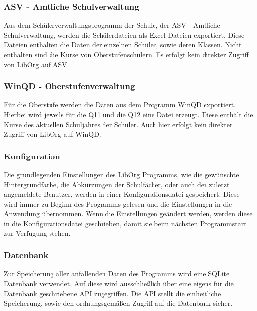 \subsubsection{ASV - Amtliche Schulverwaltung}
\label{DEF:ASV}
Aus dem Schülerverwaltungsprogramm der Schule, der ASV - Amtliche Schulverwaltung, werden die Schülerdateien als Excel-Dateien exportiert. Diese Dateien enthalten die Daten der einzelnen Schüler, sowie deren Klassen. Nicht enthalten sind die Kurse von Oberstufenschülern. Es erfolgt kein direkter Zugriff von LibOrg auf ASV.

\subsubsection{WinQD - Oberstufenverwaltung}
\label{DEF:WINQD}
Für die Oberstufe werden die Daten aus dem Programm WinQD exportiert. Hierbei wird jeweils für die Q11 und die Q12 eine Datei erzeugt. Diese enthält die Kurse des aktuellen Schuljahres der Schüler. Auch hier erfolgt kein direkter Zugriff von LibOrg auf WinQD.

\subsubsection{Konfiguration}
Die grundlegenden Einstellungen des LibOrg Programms, wie die gewünschte Hintergrundfarbe, die Abkürzungen der Schulfächer, oder auch der zuletzt angemeldete Benutzer, werden in einer Konfigurationsdatei gespeichert. Diese wird immer zu Beginn des Programms gelesen und die Einstellungen in die Anwendung übernommen. Wenn die Einstellungen geändert werden, werden diese in die Konfigurationsdatei geschrieben, damit sie beim nächsten Programmstart zur Verfügung stehen.

\subsubsection{Datenbank}
Zur Speicherung aller anfallenden Daten des Programms wird eine SQLite Datenbank verwendet. Auf diese wird ausschließlich über eine eigens für die Datenbank geschriebene API zugegriffen. Die API stellt die einheitliche Speicherung, sowie den ordnungsgemäßen Zugriff auf die Datenbank sicher. 
